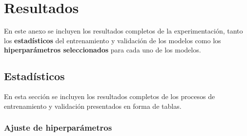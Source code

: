 \chapter{Resultados}

En este anexo se incluyen los resultados completos de la experimentación, tanto los \textbf{estadísticos} del entrenamiento y validación de los modelos como los \textbf{hiperparámetros seleccionados} para cada uno de los modelos.

\section{Estadísticos}

En esta sección se incluyen los resultados completos de los procesos de entrenamiento y validación presentados en forma de tablas.

\subsection{Ajuste de hiperparámetros}

